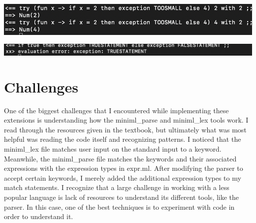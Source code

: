 \documentclass{article}
\begin{document}
\includegraphics[scale=.8]{trywith.png}

\newline


\includegraphics[scale=.8]{exception_usage.png}

\section{Challenges}
One of the biggest challenges that I encountered while implementing these extensions is understanding how the miniml\_parse and miniml\_lex tools work. I read through the resources given in the textbook, but ultimately what was most helpful was reading the code itself and recognizing patterns. I noticed that the miniml\_lex file matches user input on the standard input to a keyword. Meanwhile, the miniml\_parse file matches the keywords and their associated expressions with the expression types in expr.ml. After modifying the parser to accept certain keywords, I merely added the additional expression types to my match statements. I recognize that a large challenge in working with a less popular language is lack of resources to understand its different tools, like the parser. In this case, one of the best techniques is to experiment with code in order to understand it. 
\end{document}
